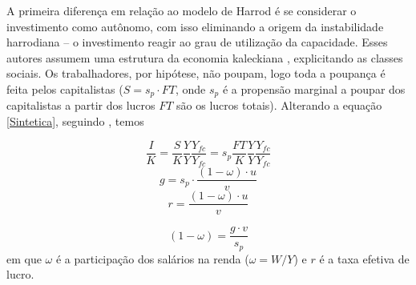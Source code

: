 A primeira diferença em relação ao modelo de Harrod é se considerar o investimento como autônomo, com isso eliminando a origem da instabilidade harrodiana – o investimento reagir ao grau de utilização da capacidade. Esses autores assumem uma estrutura da economia kaleckiana \cite{kalecki_theory_1954}, explicitando as classes sociais. Os trabalhadores, por hipótese, não poupam, logo toda a poupança é feita pelos capitalistas ($S = s_p\cdot FT$, onde $s_p$ é a propensão marginal a poupar dos capitalistas a partir dos lucros $FT$ são os lucros totais). Alterando a equação \ref{Sintetica}, seguindo \textcite{serrano_har_2018}, temos

$$
\frac{I}{K} = \frac{S}{K}\frac{Y}{Y}\frac{Y_{fc}}{Y_{fc}} = s_p\frac{FT}{K}\frac{Y}{Y}\frac{Y_{fc}}{Y_{fc}}
$$
\begin{equation}
\label{Sintetica}
g = s_p\cdot \frac{(1-\omega)\cdot u}{v}
\end{equation}
\begin{equation}
\label{LucroCambridge}
r = \frac{(1-\omega)\cdot u}{v}
\end{equation}

\begin{equation}
\label{Cambridge}
(1-\omega) = \frac{g\cdot v}{s_p}
\end{equation}
em que $\omega$ é a participação dos salários na renda ($\omega = W/Y$) e $r$ é a taxa efetiva de lucro.


